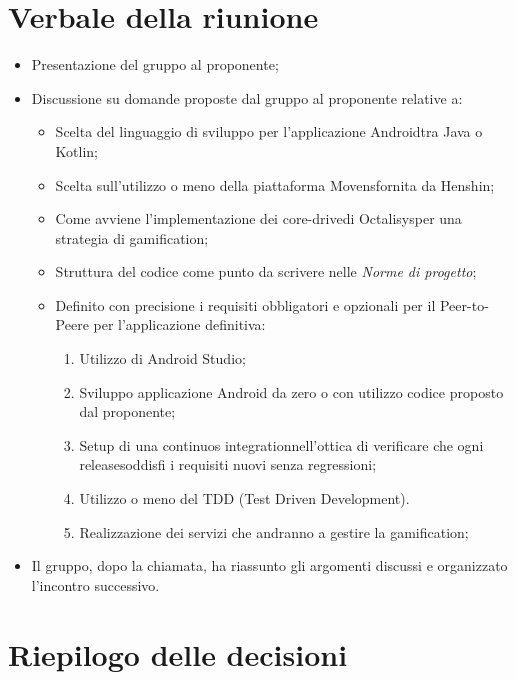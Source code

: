 \section{Verbale della riunione}
\begin{itemize}
	\item Presentazione del gruppo al proponente;
	\item Discussione su domande proposte dal gruppo al proponente relative a:
		\begin{itemize}
			\item Scelta del linguaggio di sviluppo per l'applicazione Android\glosp tra Java o Kotlin\glo;
			\item Scelta sull'utilizzo o meno della piattaforma Movens\glosp fornita da Henshin\glo;
			\item Come avviene l'implementazione dei core-drive\glosp di Octalisys\glosp per una strategia di gamification\glo;
			\item Struttura del codice come punto da scrivere nelle \textit{Norme di progetto};
			\item Definito con precisione i requisiti obbligatori e opzionali per il Peer-to-Peer\glosp e per l'applicazione definitiva:
				\begin{enumerate}
					\item Utilizzo di Android Studio;
					\item Sviluppo applicazione Android da zero o con utilizzo codice proposto dal proponente;
					\item Setup di una continuos integration\glosp nell'ottica di verificare che ogni release\glosp soddisfi i requisiti nuovi senza regressioni;
					\item Utilizzo o meno del TDD (Test Driven Development).
					\item Realizzazione dei servizi che andranno a gestire la gamification; 
				\end{enumerate}
		\end{itemize}
	\item Il gruppo, dopo la chiamata, ha riassunto gli argomenti discussi e organizzato l'incontro successivo.
\end{itemize} 
\pagebreak
\section{Riepilogo delle decisioni}

	
